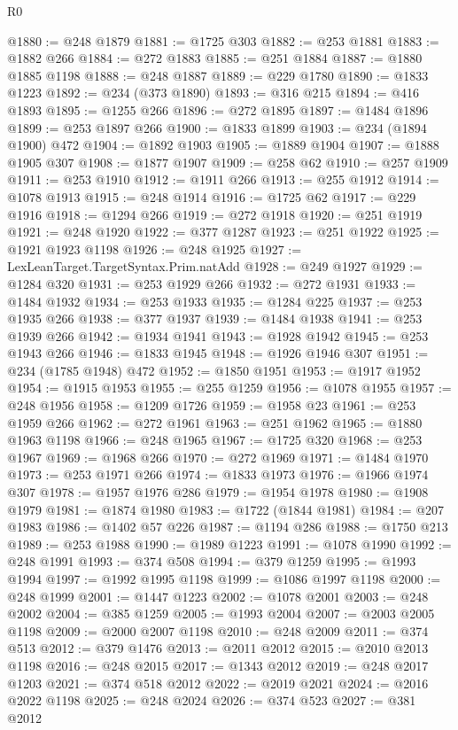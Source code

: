 \begin{lexlean}{R0}
\begin{coremodule}
@1880 := @248 @1879
@1881 := @1725 @303
@1882 := @253 @1881
@1883 := @1882 @266
@1884 := @272 @1883
@1885 := @251 @1884
@1887 := @1880 @1885 @1198
@1888 := @248 @1887
@1889 := @229 @1780
@1890 := @1833 @1223
@1892 := @234 (@373 @1890)
@1893 := @316 @215
@1894 := @416 @1893
@1895 := @1255 @266
@1896 := @272 @1895
@1897 := @1484 @1896
@1899 := @253 @1897 @266
@1900 := @1833 @1899
@1903 := @234 (@1894 @1900) @472
@1904 := @1892 @1903
@1905 := @1889 @1904
@1907 := @1888 @1905 @307
@1908 := @1877 @1907
@1909 := @258 @62
@1910 := @257 @1909
@1911 := @253 @1910
@1912 := @1911 @266
@1913 := @255 @1912
@1914 := @1078 @1913
@1915 := @248 @1914
@1916 := @1725 @62
@1917 := @229 @1916
@1918 := @1294 @266
@1919 := @272 @1918
@1920 := @251 @1919
@1921 := @248 @1920
@1922 := @377 @1287
@1923 := @251 @1922
@1925 := @1921 @1923 @1198
@1926 := @248 @1925
@1927 := LexLeanTarget.TargetSyntax.Prim.natAdd
@1928 := @249 @1927
@1929 := @1284 @320
@1931 := @253 @1929 @266
@1932 := @272 @1931
@1933 := @1484 @1932
@1934 := @253 @1933
@1935 := @1284 @225
@1937 := @253 @1935 @266
@1938 := @377 @1937
@1939 := @1484 @1938
@1941 := @253 @1939 @266
@1942 := @1934 @1941
@1943 := @1928 @1942
@1945 := @253 @1943 @266
@1946 := @1833 @1945
@1948 := @1926 @1946 @307
@1951 := @234 (@1785 @1948) @472
@1952 := @1850 @1951
@1953 := @1917 @1952
@1954 := @1915 @1953
@1955 := @255 @1259
@1956 := @1078 @1955
@1957 := @248 @1956
@1958 := @1209 @1726
@1959 := @1958 @23
@1961 := @253 @1959 @266
@1962 := @272 @1961
@1963 := @251 @1962
@1965 := @1880 @1963 @1198
@1966 := @248 @1965
@1967 := @1725 @320
@1968 := @253 @1967
@1969 := @1968 @266
@1970 := @272 @1969
@1971 := @1484 @1970
@1973 := @253 @1971 @266
@1974 := @1833 @1973
@1976 := @1966 @1974 @307
@1978 := @1957 @1976 @286
@1979 := @1954 @1978
@1980 := @1908 @1979
@1981 := @1874 @1980
@1983 := @1722 (@1844 @1981)
@1984 := @207 @1983
@1986 := @1402 @57 @226
@1987 := @1194 @286
@1988 := @1750 @213
@1989 := @253 @1988
@1990 := @1989 @1223
@1991 := @1078 @1990
@1992 := @248 @1991
@1993 := @374 @508
@1994 := @379 @1259
@1995 := @1993 @1994
@1997 := @1992 @1995 @1198
@1999 := @1086 @1997 @1198
@2000 := @248 @1999
@2001 := @1447 @1223
@2002 := @1078 @2001
@2003 := @248 @2002
@2004 := @385 @1259
@2005 := @1993 @2004
@2007 := @2003 @2005 @1198
@2009 := @2000 @2007 @1198
@2010 := @248 @2009
@2011 := @374 @513
@2012 := @379 @1476
@2013 := @2011 @2012
@2015 := @2010 @2013 @1198
@2016 := @248 @2015
@2017 := @1343 @2012
@2019 := @248 @2017 @1203
@2021 := @374 @518 @2012
@2022 := @2019 @2021
@2024 := @2016 @2022 @1198
@2025 := @248 @2024
@2026 := @374 @523
@2027 := @381 @2012

\end{coremodule}
\end{lexlean}
